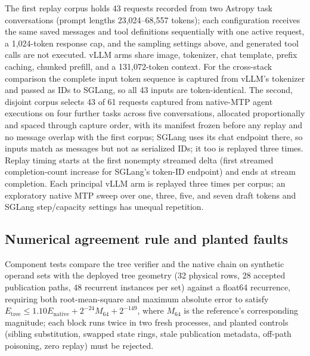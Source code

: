 \documentclass[sigconf,anonymous,review]{acmart}
\begin{document}
The first replay corpus holds 43 requests recorded from two Astropy task conversations (prompt lengths 23,024--68,557 tokens); each configuration receives the same saved messages and tool definitions sequentially with one active request, a 1,024-token response cap, and the sampling settings above, and generated tool calls are not executed. vLLM arms share image, tokenizer, chat template, prefix caching, chunked prefill, and a 131,072-token context. For the cross-stack comparison the complete input token sequence is captured from vLLM's tokenizer and passed as IDs to SGLang, so all 43 inputs are token-identical. The second, disjoint corpus selects 43 of 61 requests captured from native-MTP agent executions on four further tasks across five conversations, allocated proportionally and spaced through capture order, with its manifest frozen before any replay and no message overlap with the first corpus; SGLang uses its chat endpoint there, so inputs match as messages but not as serialized IDs; it too is replayed three times. Replay timing starts at the first nonempty streamed delta (first streamed completion-count increase for SGLang's token-ID endpoint) and ends at stream completion. Each principal vLLM arm is replayed three times per corpus; an exploratory native MTP sweep over one, three, five, and seven draft tokens and SGLang step/capacity settings has unequal repetition.

\subsection{Numerical agreement rule and planted faults}
\label{sec:method-numeric}
Component tests compare the tree verifier and the native chain on synthetic operand sets with the deployed tree geometry (32 physical rows, 28 accepted publication paths, 48 recurrent instances per set) against a float64 recurrence, requiring both root-mean-square and maximum absolute error to satisfy $E_{\mathrm{tree}}\leq 1.10E_{\mathrm{native}}+2^{-24}M_{64}+2^{-149}$, where $M_{64}$ is the reference's corresponding magnitude; each block runs twice in two fresh processes, and planted controls (sibling substitution, swapped state rings, stale publication metadata, off-path poisoning, zero replay) must be rejected.
\end{document}
